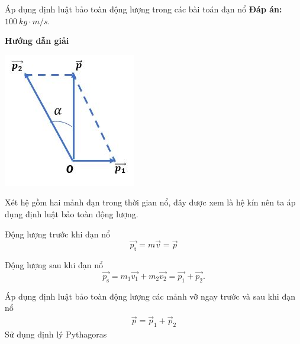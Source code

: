 \begin{dang}{Áp dụng định luật bảo toàn động lượng trong các bài toán đạn nổ}
{		\textbf{Đáp án:} $\SI{100}{kg \cdot m/s}$.
	}
	{	\begin{center}
			\textbf{Hướng dẫn giải}
		\end{center}
		
		\begin{center}
			\includegraphics[scale=0.6]{../figs/VN10-PH-29-L-021-4-1.JPG}
		\end{center}
		Xét hệ gồm hai mảnh đạn trong thời gian nổ, đây được xem là hệ kín nên ta áp dụng định luật bảo toàn động lượng.
		
		Động lượng trước khi đạn nổ
		\begin{equation*}
			\vec{p_{\text{t}}} =m\vec{v}=\vec p
		\end{equation*}
		
		Động lượng sau khi đạn nổ
		\begin{equation*}
			\vec{p_{\text{s}}}=m_1\vec{v_1}+m_2 \vec{v_2} =\vec{p_1} + \vec{p_2}. 
		\end{equation*}
		
		Áp dụng định luật bảo toàn động lượng các mảnh vỡ ngay trước và sau khi đạn nổ
		\begin{align*}
			\vec{p}=\vec{p}_1+\vec{p}_2
		\end{align*}
Sử dụng định lý Pythagoras
		
}
\end{dang}
